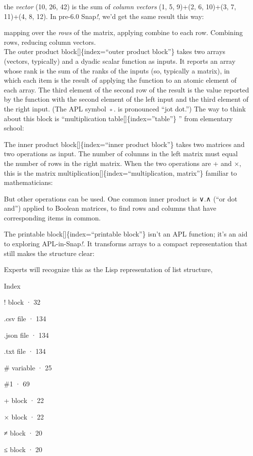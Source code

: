 \documentclass[
  letterpaper,
]{book}
\begin{document}
the \emph{vector} (10, 26, 42) is the sum of \emph{column vectors} (1,
5, 9)+(2, 6, 10)+(3, 7, 11)+(4, 8, 12). In pre-6.0 Snap\emph{!}, we'd
get the same result this way:

mapping over the \emph{rows} of the matrix, applying combine to each
row. Combining rows, reducing column vectors.\\
The outer product block{[}{]}\{index=``outer product block''\} takes two
arrays (vectors, typically) and a dyadic scalar function as inputs. It
reports an array whose rank is the sum of the ranks of the inputs (so,
typically a matrix), in which each item is the result of applying the
function to an atomic element of each array. The third element of the
second row of the result is the value reported by the function with the
second element of the left input and the third element of the right
input. (The APL symbol ◦. is pronounced ``jot dot.'') The way to think
about this block is ``multiplication table{[}{]}\{index=''table''\} ''
from elementary school:

The inner product block{[}{]}\{index=``inner product block''\} takes two
matrices and two operations as input. The number of columns in the left
matrix must equal the number of rows in the right matrix. When the two
operations are + and ×, this is the matrix
multiplication{[}{]}\{index=``multiplication, matrix''\} familiar to
mathematicians:

But other operations can be used. One common inner product is ∨.∧ (``or
dot and'') applied to Boolean matrices, to find rows and columns that
have corresponding items in common.

The printable block{[}{]}\{index=``printable block''\} isn't an APL
function; it's an aid to exploring APL-in-Snap\emph{!}. It transforms
arrays to a compact representation that still makes the structure clear:

Experts will recognize this as the Lisp representation of list
structure,

Index

! block · 32

.csv file · 134

.json file · 134

.txt file · 134

\# variable · 25

\#1 · 69

+ block · 22

× block · 22

≠ block · 20

≤ block · 20
\end{document}
